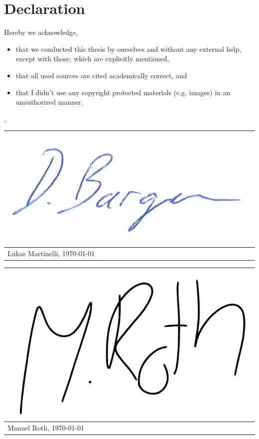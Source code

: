 

\chapter*{Declaration} %

\thispagestyle{empty}

Hereby we acknowledge,

\begin{itemize}
		\item that we conducted this thesis by ourselves and without any external help,
			except with those, which are explicitly mentioned,
		\item that all used sources are cited academically correct, and 
		\item that I didn't use any copyright protected materials (e.g. images) in
			an unauthorized manner.
\end{itemize}

\bigskip
 
\noindent\textit{\myLocation, \myTime}

\bigskip

\begin{flushright}
    \begin{tabular}{m{8cm}}
    \hspace{2cm}\includegraphics[width=.33\textwidth]{images/signature.png}
    \\ \hline
    \centering Lukas Martinelli, \today \\
    \end{tabular}
\end{flushright}

\begin{flushright}
    \begin{tabular}{m{8cm}}
    \hspace{2cm}\includegraphics[width=.33\textwidth]{images/signature_manuel.png}
    \\ \hline
    \centering Manuel Roth, \today \\
    \end{tabular}
\end{flushright}


